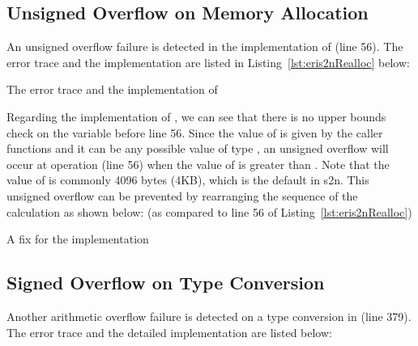 \subsection{Unsigned Overflow on Memory Allocation}
An unsigned overflow failure is detected in the implementation of  (line 56). The error trace and the implementation are listed in Listing~\ref{lst:eris2nRealloc} below:

\begin{listing}[ht]

\caption{The error trace and the implementation of }
\label{lst:eris2nRealloc}
\end{listing}

Regarding the implementation of , we can see that there is no upper bounds check on the variable  before line 56. Since the value of  is given by the caller functions and it can be any possible value of type , an unsigned overflow will occur at  operation (line 56) when the value of  is greater than . Note that the value of  is commonly 4096 bytes (4KB), which is the default in s2n.
This unsigned overflow can be prevented by rearranging the sequence of the calculation as shown below: (as compared to line 56 of Listing~\ref{lst:eris2nRealloc})

\begin{listing}[ht]
\caption{A fix for the implementation }
\label{lst:fis2nRealloc}
\end{listing}


\subsection{Signed Overflow on Type Conversion}
Another arithmetic overflow failure is detected on a type conversion in  (line 379). The error trace and the detailed implementation are listed below: 

